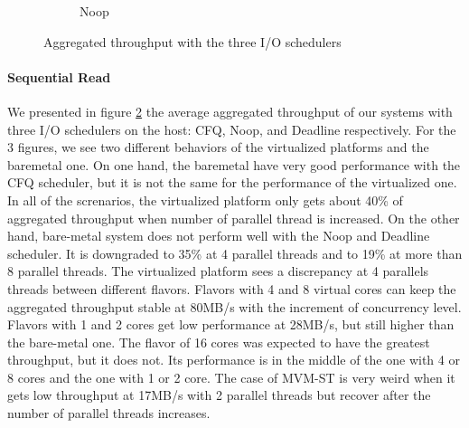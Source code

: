 \documentclass{acmsig}
\begin{document}
\begin{figure}[t]
\begin{subfigure}[b]{0.3\textwidth}
     \caption{Noop}
     \label{fig:aggthroughput_noop_write}
   \end{subfigure}
   \caption{Aggregated throughput with the three I/O schedulers}\label{fig:aggthroughput}
\end{figure}

\paragraph{Sequential Read}
We presented in figure \ref{fig:aggthroughput} the average aggregated throughput of our systems with three I/O schedulers on the host: CFQ, Noop, and Deadline respectively. For the 3 figures, we see two different behaviors of the virtualized platforms and the baremetal one. On one hand, the baremetal have very good performance with the CFQ scheduler, but it is not the same for the performance of the virtualized one. In all of the screnarios, the virtualized platform only gets about 40\% of aggregated throughput when number of parallel thread is increased. On the other hand, bare-metal system does not perform well with the Noop and Deadline scheduler. It is downgraded to 35\% at 4 parallel threads and to 19\% at more than 8 parallel threads. The virtualized platform sees a discrepancy at 4 parallels threads between different flavors. Flavors with 4 and 8 virtual cores can keep the aggregated throughput stable at 80MB/s with the increment of concurrency level. Flavors with 1 and 2 cores get low performance at 28MB/s, but still higher than the bare-metal one. The flavor of 16 cores was expected to have the greatest throughput, but it does not. Its performance is in the middle of the one with 4 or 8 cores and the one with 1 or 2 core. The case of MVM-ST is very weird when it gets low throughput at 17MB/s with 2 parallel threads but recover after the number of parallel threads increases.
\end{document}
